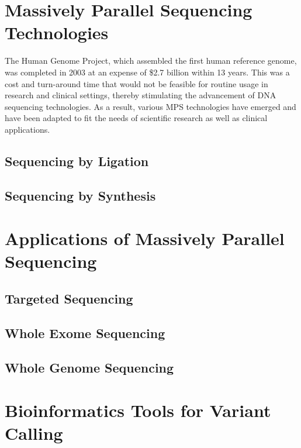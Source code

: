 \section{Massively Parallel Sequencing Technologies}
\label{sec:MassivelyParallelSequencingTechnologies}

The Human Genome Project, which assembled the first human reference genome, was completed in 2003 at an expense of \$2.7 billion within 13 years. This was a cost and turn-around time that would not be feasible for routine usage in research and clinical settings, thereby stimulating the advancement of DNA sequencing technologies. As a result, various MPS technologies have emerged and have been adapted to fit the needs of scientific research as well as clinical applications.

\subsection{Sequencing by Ligation}

\subsection{Sequencing by Synthesis}

\section{Applications of Massively Parallel Sequencing}
\label{sec:ApplicationsofMassivelyParallelSequencing}

\subsection{Targeted Sequencing}

\subsection{Whole Exome Sequencing}

\subsection{Whole Genome Sequencing}

\section{Bioinformatics Tools for Variant Calling}
\label{sec:BioinformaticsToolsforVariantCalling}

